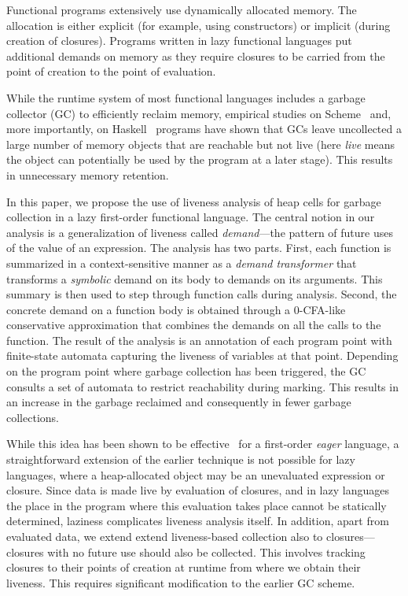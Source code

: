 \documentclass[9pt]{sigplanconf}
\begin{document}
Functional programs extensively use dynamically allocated memory.  The
allocation  is either  explicit (for  example, using  constructors) or
implicit  (during creation  of  closures).  Programs  written in  lazy
functional languages put additional  demands on memory as they require
closures to  be carried  from the  point of creation  to the  point of
evaluation.

While  the runtime  system  of most  functional  languages includes  a
garbage  collector  (GC)  to  efficiently  reclaim  memory,  empirical
studies on Scheme~\cite{karkare06effectiveness} and, more importantly,
on  Haskell~\cite{rojemo96lag}  programs  have shown  that  GCs  leave
uncollected a  large number of  memory objects that are  reachable but
not live (here {\em live} means  the object can potentially be used by
the program  at a  later stage).  This  results in  unnecessary memory
retention.

In this paper,  we propose the use of liveness  analysis of heap cells
for garbage collection in a lazy first-order functional language.  The
central notion in our analysis  is a generalization of liveness called
{\em  demand}---the  pattern  of  future  uses  of  the  value  of  an
expression.   The analysis  has two  parts.  First,  each function  is
summarized in a context-sensitive manner as a {\em demand transformer}
that transforms a {\em symbolic} demand  on its body to demands on its
arguments.  This summary  is then used to step  through function calls
during analysis.   Second, the concrete  demand on a function  body is
obtained through a 0-CFA-like conservative approximation that combines
the  demands on  all the  calls to  the function.   The result  of the
analysis  is an  annotation of  each program  point with  finite-state
automata capturing the liveness of  variables at that point. Depending
on the program point where  garbage collection has been triggered, the
GC consults a set of  automata to restrict reachability during marking.
This results in an increase  in the garbage reclaimed and consequently
in fewer garbage collections.

While this idea has been shown to be effective~\cite{asati14lgc} for a
first-order {\em  eager} language, a straightforward  extension of the
earlier  technique  is  not  possible  for  lazy  languages,  where  a
heap-allocated   object   may   be  an   unevaluated   expression   or
closure. Since  data is made  live by  evaluation of closures,  and in
lazy languages  the place in  the program where this  evaluation takes
place cannot  be statically determined, laziness  complicates liveness
analysis itself.   In addition, apart  from evaluated data,  we extend
extend liveness-based  collection also to closures---closures  with no
future use should also be  collected.  This involves tracking closures
to their  points of  creation at  runtime from  where we  obtain their
liveness.  This  requires significant  modification to the  earlier GC
scheme.  
\end{document}

